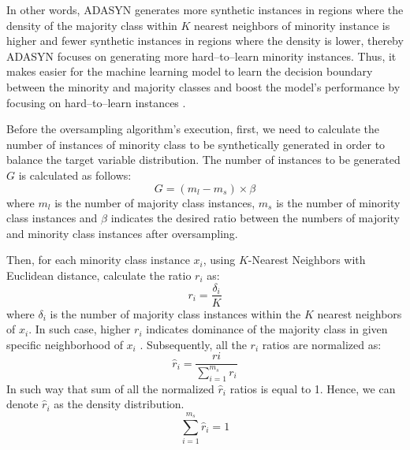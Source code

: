 In other words, ADASYN generates more synthetic instances in regions where the density of the majority class within $K$ nearest neighbors of minority instance is higher and fewer synthetic instances in regions where the density is lower, thereby ADASYN focuses on generating more hard--to--learn minority instances.
Thus, it makes easier for the machine learning model to learn the decision boundary between the minority and majority classes and boost the model's performance by focusing on hard--to--learn instances \citep{adasynhaibo}.

Before the oversampling algorithm's execution, first, we need to calculate the number of instances of minority class to be synthetically generated in order to balance the target variable distribution. The number of instances to be generated $G$ is calculated as follows:
\begin{equation}\label{eq}
    G = \left(m_{l} - m_{s}\right) \times \beta
\end{equation}
where $m_l$ is the number of majority class instances, $m_s$ is the number of minority class instances and $\beta$ indicates the desired ratio between the numbers of majority and minority class instances after oversampling.

Then, for each minority class instance $x_i$, using $K$-Nearest Neighbors with Euclidean distance, calculate the ratio $r_i$ as:
\begin{equation}\label{eq}
   r_{i} = \frac{\delta_{i}} {K}
\end{equation}
where $\delta_{i}$ is the number of majority class instances within the $K$ nearest neighbors of $x_i$.
In such case, higher $r_i$ indicates dominance of the majority class in given specific neighborhood of $x_i$ \citep{nian2018introduction}.
Subsequently, all the $r_i$ ratios are normalized as:
\begin{equation}\label{eq}
    \hat{r}_{i} = \frac{r{i}}{\displaystyle\sum_{i=1}^{m_{s}} r_{i}}
\end{equation}
In such way that sum of all the normalized $\hat{r}_i$ ratios is equal to 1. Hence, we can denote $\hat{r}_i$ as the density distribution.
\begin{equation}\label{eq}
    \sum_{i=1}^{m_{s}} \hat{r}_{i} = 1
\end{equation}

